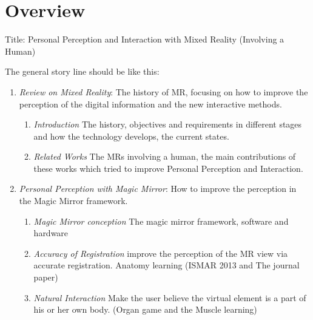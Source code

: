 %
\chapter*{Overview}
\vspace*{-15mm}
\label{sec:methods}

Title: Personal Perception and Interaction with Mixed Reality (Involving a Human)

The general story line should be like this:
\begin{enumerate}
	\item
		\emph{Review on Mixed Reality}: The history of MR, focusing on how to improve the perception of the digital information and the new interactive methods. 
		 \begin{enumerate}
		  \item	\emph{Introduction} The history, objectives and requirements in different stages and how the technology develops, the current states.
		  \item	\emph{Related Works} The MRs involving a human, the main contributions of these works which tried to improve Personal Perception and Interaction. 
		 \end{enumerate}
	
	\item
		\emph{Personal Perception with Magic Mirror}: How to improve the perception in the Magic Mirror framework.
		\begin{enumerate}
		\item	\emph{Magic Mirror conception} The magic mirror framework, software and hardware
		\item	\emph{Accuracy of Registration} improve the perception of the MR view via accurate registration. Anatomy learning (ISMAR 2013 and The journal paper)
		\item	\emph{Natural Interaction} Make the user believe the virtual element is a part of his or her own body. (Organ game and the Muscle learning)
		\end{enumerate}
	

\end{enumerate}
